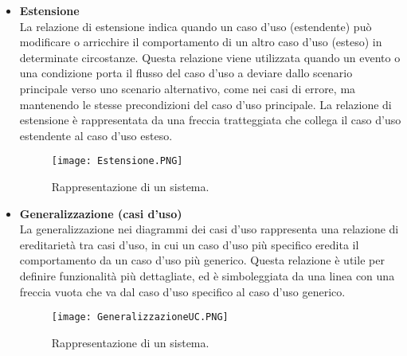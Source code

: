 \begin{itemize}
        \item \textbf{Estensione}\\
        La relazione di estensione indica quando un caso d'uso (estendente) può modificare o arricchire il comportamento di un altro caso d'uso (esteso) in determinate circostanze. Questa relazione viene utilizzata quando un evento o una condizione porta il flusso del caso d'uso a deviare dallo scenario principale verso uno scenario alternativo, come nei casi di errore, ma mantenendo le stesse precondizioni del caso d'uso principale. La relazione di estensione è rappresentata da una freccia tratteggiata che collega il caso d'uso estendente al caso d'uso esteso.
        \begin{figure}[H]
        \centering
        \texttt{[image: Estensione.PNG]}
        \caption{Rappresentazione di un sistema.}
        \end{figure}

        \item \textbf{Generalizzazione (casi d'uso)}\\
        La generalizzazione nei diagrammi dei casi d’uso rappresenta una relazione di ereditarietà tra casi d’uso, in cui un caso d’uso più specifico eredita il comportamento da un caso d’uso più generico. Questa relazione è utile per definire funzionalità più dettagliate, ed è simboleggiata da una linea con una freccia vuota che va dal caso d'uso specifico al caso d'uso generico.
        \begin{figure}[H]
        \centering
        \texttt{[image: GeneralizzazioneUC.PNG]}
        \caption{Rappresentazione di un sistema.}
        \end{figure}
\end{itemize}

